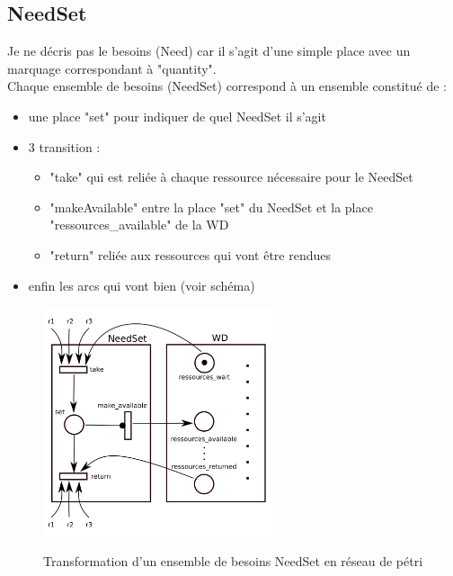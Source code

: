 \newpage
\subsection{NeedSet}
Je ne décris pas le besoins (Need) car il s'agit d'une simple place avec un marquage correspondant à "quantity".\\

Chaque ensemble de besoins (NeedSet) correspond à un ensemble constitué de :
\begin{itemize}
   \item une place "set" pour indiquer de quel NeedSet il s'agit
   \item 3 transition :
      \begin{itemize}
         \item "take" qui est reliée à chaque ressource nécessaire pour le NeedSet
         \item "makeAvailable" entre la place "set" du NeedSet et la place "ressources\_available" de la WD
         \item "return" reliée aux ressources qui vont être rendues
      \end{itemize}
   \item enfin les arcs qui vont bien (voir schéma)
\end{itemize}

\begin{figure}[h]
\centering
\includegraphics[width=0.6\textwidth]{../Images/NeedSet2petri.png}
\label{WD2petri}
\caption{Transformation d'un ensemble de besoins NeedSet en réseau de pétri}
\end{figure}

